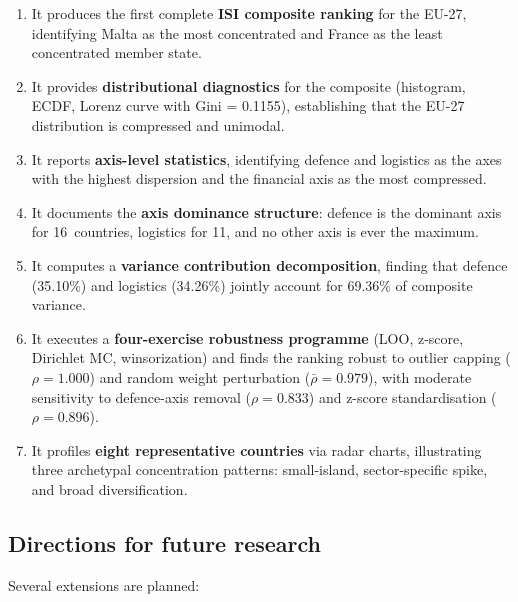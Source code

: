 \begin{enumerate}[leftmargin=2em]
  \item It produces the first complete \textbf{ISI composite ranking}
    for the EU-27, identifying Malta as the most concentrated and
    France as the least concentrated member state.

  \item It provides \textbf{distributional diagnostics} for the
    composite (histogram, ECDF, Lorenz curve with Gini = \num{0.1155}),
    establishing that the EU-27 distribution is compressed and
    unimodal.

  \item It reports \textbf{axis-level statistics}, identifying defence
    and logistics as the axes with the highest dispersion and the
    financial axis as the most compressed.

  \item It documents the \textbf{axis dominance structure}: defence is
    the dominant axis for 16~countries, logistics for 11, and no other
    axis is ever the maximum.

  \item It computes a \textbf{variance contribution decomposition},
    finding that defence (35.10\%) and logistics (34.26\%) jointly
    account for 69.36\% of composite variance.

  \item It executes a \textbf{four-exercise robustness programme}
    (LOO, z-score, Dirichlet MC, winsorization) and finds the
    ranking robust to outlier capping ($\rho = 1.000$) and random
    weight perturbation ($\bar{\rho} = 0.979$), with moderate
    sensitivity to defence-axis removal ($\rho = 0.833$) and
    z-score standardisation ($\rho = 0.896$).

  \item It profiles \textbf{eight representative countries} via
    radar charts, illustrating three archetypal concentration
    patterns: small-island, sector-specific spike, and broad
    diversification.
\end{enumerate}

\subsection{Directions for future research}

Several extensions are planned:

